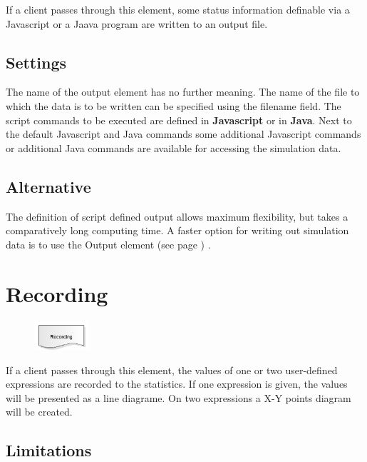 If a client passes through this element, some status information definable via
a Javascript or a Jaava program are written to an output file.

\subsection*{Settings}

The name of the output element has no further meaning. The name of the file to which the data is to be written
can be specified using the filename field. The script commands to be executed are defined in \textbf{Javascript}
or in \textbf{Java}. Next to the default Javascript and Java commands some
additional Javascript commands or additional Java commands 
are available for accessing the simulation data.

\subsection*{Alternative}

The definition of script defined output allows maximum flexibility, but takes a comparatively long
computing time. A faster option for writing out simulation data is to use the
Output element (see page \pageref{ref:ModelElementOutput}) .


\section{Recording}
\label{ref:ModelElementRecord}

\begin{figure}
\vspace{-22pt}
\includegraphics[width=2cm]{imageModelElementRecord.png}
\vspace{-22pt}
\end{figure}

If a client passes through this element, the values of one or two user-defined expressions
are recorded to the statistics. If one expression is given, the values will be presented
as a line diagrame. On two expressions a X-Y points diagram will be created.

\subsection*{Limitations}

